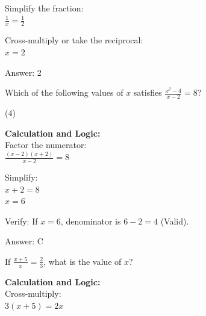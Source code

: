\documentclass[11pt,paper=a4,answers]{exam}
\begin{document}
\begin{questions}
\begin{solution}
\vspace{15pt}

Simplify the fraction: \\
$\frac{1}{x} = \frac{1}{2}$

\vspace{15pt}

Cross-multiply or take the reciprocal: \\
$x = 2$

\vspace{30pt}

Answer: \colorbox{yellow!100}{2}
\end{solution}

\vspace{40pt}

\question
Which of the following values of $x$ satisfies $\frac{x^2 - 4}{x - 2} = 8$?
\begin{tasks}(4)
\end{tasks}

\begin{solution}
\textbf{Calculation and Logic:} \\
Factor the numerator: \\
$\frac{(x-2)(x+2)}{x-2} = 8$

\vspace{15pt}

Simplify: \\
$x + 2 = 8$ \\
$x = 6$

\vspace{15pt}

Verify: If $x=6$, denominator is $6-2=4$ (Valid).

\vspace{30pt}

Answer: \colorbox{yellow!100}{C}
\end{solution}

\vspace{40pt}

\question
If $\frac{x+5}{x} = \frac{2}{3}$, what is the value of $x$?

\begin{solution}
\textbf{Calculation and Logic:} \\
Cross-multiply: \\
$3(x + 5) = 2x$


\end{solution}
\end{questions}
\end{document}
